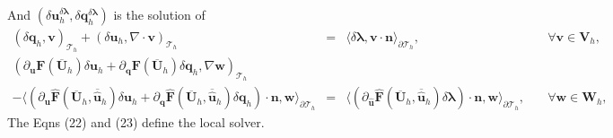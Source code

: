 \documentclass[11pt]{article}
\begin{document}
And $(\delta \bm{u}_h^{\delta \bm{\lambda}},\delta \bm{q}_h^{\delta \bm{\lambda}})$ is the solution of
\begin{equation}
\begin{array}{rcll}
(\delta \bm{q}_h, \bm{v})_{\mathcal{T}_h} + (\delta \bm{u}_h, \nabla \cdot \bm{v})_{\mathcal{T}_h}  & = & \langle \delta {\bm{\lambda}}, \bm{v} \cdot \bm{n} \rangle_{\partial \mathcal{T}_h} , & \quad \forall \bm{v} \in \bm{V}_h, \\[2ex] 
(\partial_{\bm{u}} \bm{F} (\overline{\bm{U}}_h) \delta \bm{u}_h + \partial_{\bm{q}} \bm{F} (\overline{\bm{U}}_h) \delta \bm{q}_h, \nabla \bm{w})_{\mathcal{T}_h} & & \\[2ex]
- \langle (\partial_{\bm{u}} \widehat{\bm{F}} (\overline{\bm{U}}_h, \overline{\widehat{\bm{u}}}_h) \delta \bm{u}_h + \partial_{{\bm{q}}} \widehat{\bm{F}} (\overline{\bm{U}}_h, \overline{\widehat{\bm{u}}}_h) \delta {\bm{q}}_h) \cdot \bm{n}, \bm{w} \rangle_{\partial \mathcal{T}_h}  & = &  \langle (\partial_{\widehat{\bm{u}}} \widehat{\bm{F}} (\overline{\bm{U}}_h, \overline{\widehat{\bm{u}}}_h) \delta {\bm{\lambda}}) \cdot \bm{n}, \bm{w} \rangle_{\partial \mathcal{T}_h},  & \quad \forall \bm{w} \in \bm{W}_h,
\end{array}
\end{equation}
The Eqns (22) and (23) define the local solver.
\end{document}
